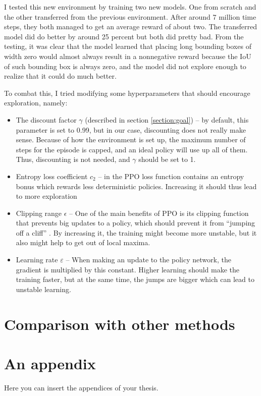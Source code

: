 \documentclass[
  digital,     %
  oneside,     %
  nosansbold,  %
  nocolorbold, %
  lof,         %
  lot,         %
]{fithesis4}
\begin{document}
I tested this new environment by training two new models. One from scratch and the other transferred from the previous environment. After around 7 million time steps, they both managed to get an average reward of about two. The transferred model did do better by around 25 percent but both did pretty bad. From the testing, it was clear that the model learned that placing long bounding boxes of width zero would almost always result in a nonnegative reward because the IoU of such bounding box is always zero, and the model did not explore enough to realize that it could do much better.

To combat this, I tried modifying some hyperparameters that should encourage exploration, namely:
\begin{itemize}
    \item The discount factor $\gamma$ (described in section \ref{section:goal}) -- by default, this parameter is set to 0.99, but in our case, discounting does not really make sense. Because of how the environment is set up, the maximum number of steps for the episode is capped, and an ideal policy will use up all of them. Thus, discounting is not needed, and $\gamma$ should be set to 1.
    \item Entropy loss coefficient $c_2$ -- in the PPO loss function contains an entropy bonus which rewards less deterministic policies. Increasing it should thus lead to more exploration \cite{PPO_paper}
    \item Clipping range $\epsilon$ -- One of the main benefits of PPO is its clipping function that prevents big updates to a policy, which should prevent it from \enquote{jumping off a cliff} \cite{PPO_paper}. By increasing it, the training might become more unstable, but it also might help to get out of local maxima.
    \item Learning rate $\varepsilon$ -- When making an update to the policy network, the gradient is multiplied by this constant. Higher learning should make the training faster, but at the same time, the jumps are bigger which can lead to unstable learning.
\end{itemize}

\chapter{Comparison with other methods}


\printbibliography[heading=bibintoc] %


\appendix %
\chapter{An appendix}
Here you can insert the appendices of your thesis.
\end{document}
